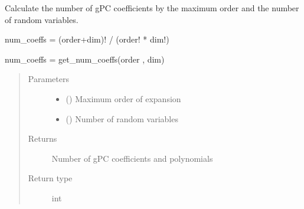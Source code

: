 \documentclass[letterpaper,10pt,english,openany,oneside]{sphinxmanual}
\begin{document}

\begin{fulllineitems}
\label{\detokenize{pygpc:pygpc.misc.get_num_coeffs}}
Calculate the number of gPC coefficients by the maximum order and the number of random variables.

num\_coeffs = (order+dim)! / (order! * dim!)

num\_coeffs = get\_num\_coeffs(order , dim)
\begin{quote}\begin{description}
\item[{Parameters}] \leavevmode\begin{itemize}
\item {} 
 () \textendash{} Maximum order of expansion

\item {} 
 () \textendash{} Number of random variables

\end{itemize}

\item[{Returns}] \leavevmode
{} \textendash{} Number of gPC coefficients and polynomials

\item[{Return type}] \leavevmode
int

\end{description}\end{quote}

\end{fulllineitems}

\end{document}
